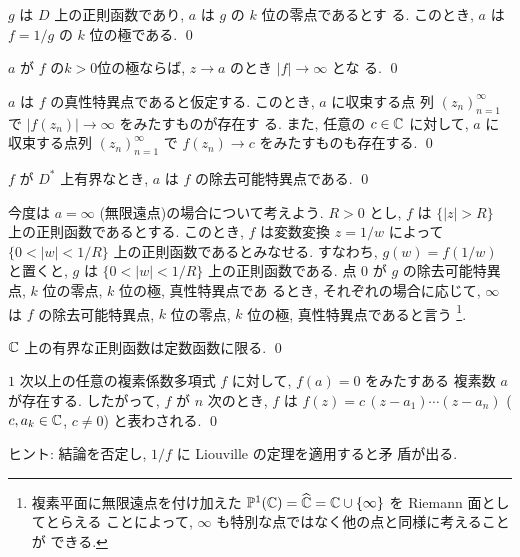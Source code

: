 \documentclass[12pt,twoside]{jarticle}
\begin{document}
\begin{question}
  $g$ は $D$ 上の正則函数であり, $a$ は $g$ の $k$ 位の零点であるとす
  る. このとき, $a$ は $f=1/g$ の $k$ 位の極である. \qed
\end{question}

\begin{question}
  $a$ が $f$ の$k>0$位の極ならば, $z\to a$ のとき $|f|\to\infty$ とな
  る. \qed
\end{question}

\begin{question}
  $a$ は $f$ の真性特異点であると仮定する.  このとき, $a$ に収束する点
  列 $(z_n)_{n=1}^\infty$ で $|f(z_n)|\to\infty$ をみたすものが存在す
  る. また, 任意の $c\in{\mathbb C}$ に対して, $a$ に収束する点列 
  $(z_n)_{n=1}^\infty$ で $f(z_n)\to c$ をみたすものも存在する.  \qed
\end{question}

\begin{question}
  $f$ が $D^*$ 上有界なとき, $a$ は $f$ の除去可能特異点である. \qed
\end{question}


今度は $a=\infty$ (無限遠点)の場合について考えよう. $R > 0$ とし, $f$ は %
$\{|z|>R\}$ 上の正則函数であるとする. このとき, $f$ は変数変換 $z=1/w$ %
によって $\{0<|w|<1/R\}$ 上の正則函数であるとみなせる. すなわち,
$g(w)=f(1/w)$ と置くと, $g$ は $\{0<|w|<1/R\}$ 上の正則函数である. 点 %
$0$ が $g$ の除去可能特異点, $k$ 位の零点, $k$ 位の極, 真性特異点であ
るとき, それぞれの場合に応じて, $\infty$ は $f$ の除去可能特異点, $k$ %
位の零点, $k$ 位の極, 真性特異点であると言う%
\footnote{複素平面に無限遠点を付け加えた 
  ${\mathbb P}^1({\mathbb C})=\widehat{{\mathbb C}}={\mathbb C}\cup\{\infty\}$ を Riemann 面としてとらえる
  ことによって, $\infty$ も特別な点ではなく他の点と同様に考えることが
  できる.}.

\begin{question}
  ${\mathbb C}$ 上の有界な正則函数は定数函数に限る. \qed
\end{question}

\begin{question}[代数学の基本定理]
  $1$ 次以上の任意の複素係数多項式 $f$ に対して, $f(a)=0$ をみたすある
  複素数 $a$ が存在する. したがって, $f$ が $n$ 次のとき, $f$ は %
  $f(z)=c\,(z-a_1)\cdots(z-a_n)$ ($c,a_k\in{\mathbb C}$, $c\ne0$) と表わされる.
  \qed
\end{question}

\noindent ヒント: 結論を否定し, $1/f$ に Liouville の定理を適用すると矛
盾が出る.
\end{document}
